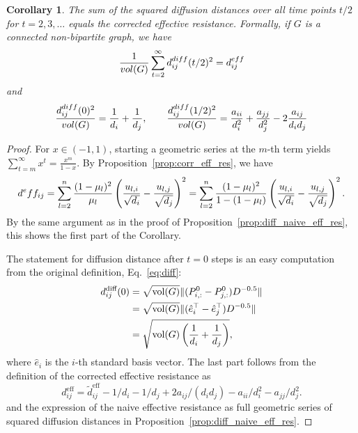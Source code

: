 \documentclass{article}
\theoremstyle{plain}
\newtheorem{corollary}[theorem]{Corollary}
\theoremstyle{definition}
\theoremstyle{remark}
\begin{document}
\begin{corollary}\label{cor:diff_corr_eff_res}
    The sum of the squared diffusion distances over all time points $t/2$ for $t=2, 3, \dots$ equals the corrected effective resistance. Formally, if $G$ is a connected non-bipartite graph, we have
    \begin{equation}
        \frac{1}{\textnormal{vol}(G)}\sum_{t=2}^\infty d^{\textnormal{diff}}_{ij}(t/2)^2 = d^{\textnormal{eff}}_{ij}\label{eq:diff_corr_eff_res}
    \end{equation}
   and
    \begin{equation}
        \frac{d^{\textnormal{diff}}_{ij}(0)^2}{\textnormal{vol}(G)} =  \frac{1}{d_i} + \frac{1}{d_j}, \qquad
        \frac{d^{\textnormal{diff}}_{ij}(1/2)^2}{\textnormal{vol}(G)} = \frac{a_{ii}}{d_i^2} + \frac{a_{jj}}{d_j^2}  - 2 \frac{a_{ij}}{d_id_j}
    \end{equation}
\end{corollary}
\begin{proof}
    For $x\in (-1, 1)$, starting a geometric series at the $m$-th term yields $\sum_{t=m}^\infty x^t= \frac{x^m}{1-x}$. By Proposition~\ref{prop:corr_eff_res}, we have 
    \begin{equation}
        d^\textnormal{eff}_{ij} = \sum_{l=2}^n \frac{(1-\mu_l)^2}{\mu_l}\left(\frac{u_{l, i}}{\sqrt{d_i}} - \frac{u_{l, j}}{\sqrt{d_j}}\right)^2  =  \sum_{l=2}^n \frac{(1-\mu_l)^2}{1-(1-\mu_l)}\left(\frac{u_{l, i}}{\sqrt{d_i}} - \frac{u_{l, j}}{\sqrt{d_j}}\right)^2.
    \end{equation}
    By the same argument as in the proof of Proposition~\ref{prop:diff_naive_eff_res}, this shows the first part of the Corollary. 

    The statement for diffusion distance after $t=0$ steps is an easy computation from the original definition, Eq.~\eqref{eq:diff}:
    \begin{align}
        d^\text{diff}_{ij}(0) &= \sqrt{\text{vol}(G)}\|(P^0_{i, :}- P^0_{j, :})D^{-0.5}\|\notag \\
        &= \sqrt{\text{vol}(G)}\|(\hat{e}_i^\top- \hat{e}_j^\top)D^{-0.5}\| \notag \\
        &=  \sqrt{\text{vol}(G) \left(\frac{1}{d_i} + \frac{1}{d_j}\right)},
    \end{align}
    where $\hat{e}_i$ is the $i$-th standard basis vector. The last part follows from the definition of the corrected effective resistance as 
    \begin{equation}
        d^\text{eff}_{ij} = \tilde{d}^\text{eff}_{ij} - 1/d_i - 1/d_j + 2 a_{ij}/(d_id_j) - a_{ii}/d_i^2 - a_{jj}/d_j^2.
    \end{equation}
    and the expression of the naive effective resistance as full geometric series of squared diffusion distances in Proposition~\ref{prop:diff_naive_eff_res}.
\end{proof}
\end{document}
